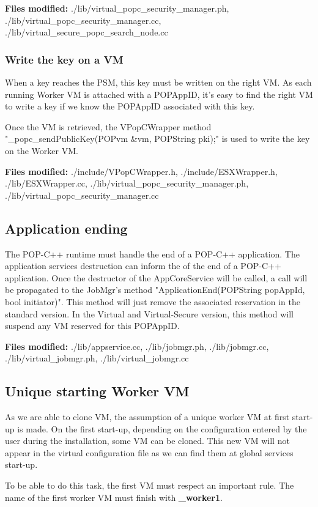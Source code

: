 \textbf{Files modified: } ./lib/virtual\_popc\_security\_manager.ph, ./lib/virtual\_popc\_security\_manager.cc, ./lib/virtual\_secure\_popc\_search\_node.cc

\subsubsection{Write the key on a VM}
When a key reaches the PSM, this key must be written on the right VM. As each running Worker VM is attached with a POPAppID, it's easy to find the right VM to write a key if we know the POPAppID associated with this key. \s

Once the VM is retrieved, the VPopCWrapper method "\_popc\_sendPublicKey(POPvm \&vm, POPString pki);" is used to write the key on the Worker VM.\s

\textbf{Files modified:} ./include/VPopCWrapper.h, ./include/ESXWrapper.h, ./lib/ESXWrapper.cc, ./lib/virtual\_popc\_security\_manager.ph, ./lib/virtual\_popc\_security\_manager.cc


\subsection{Application ending}
The POP-C++ runtime must handle the end of a POP-C++ application. The application services destruction can inform the of the end of a POP-C++ application. Once the destructor of the AppCoreService will be called, a call will be propagated to the JobMgr's method "ApplicationEnd(POPString popAppId, bool initiator)". This method will just remove the associated reservation in the standard version. In the Virtual and Virtual-Secure version, this method will suspend any VM reserved for this POPAppID. \s

\textbf{Files modified:} ./lib/appservice.cc, ./lib/jobmgr.ph, ./lib/jobmgr.cc, ./lib/virtual\_jobmgr.ph, ./lib/virtual\_jobmgr.cc


\subsection{Unique starting Worker VM}
As we are able to clone VM, the assumption of a unique worker VM at first start-up is made. On the first start-up, depending on the configuration entered by the user during the installation, some VM can be cloned. This new VM will not appear in the virtual configuration file as we can find them at global services start-up. \s

To be able to do this task, the first VM must respect an important rule. The name of the first worker VM must finish with \textbf{\_worker1}.


